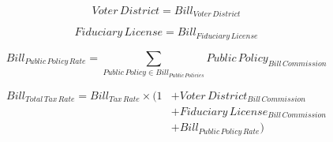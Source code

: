 \documentclass[fleqn]{article}
\begin{document}
	
\Large
	
\begin{equation}
	Voter \, District = Bill_{Voter \, District} 
\end{equation}


\begin{equation} 
	Fiduciary \, License = Bill_{Fiduciary \, License}
\end{equation}

\begin{equation}
	Bill_{Public \, Policy \, Rate} = \displaystyle\sum_{Public \, Policy \in Bill_{Public \, Policies}} Public \, Policy_{Bill \, Commission} 	
\end{equation}

\begin{equation}
	\begin{split}
	Bill_{Total \, Tax \, Rate} = Bill_{Tax \, Rate} \times (1 & + Voter \, District_{Bill \, Commission} \\
	& + Fiduciary \, License_{Bill \, Commission} \\
	& + Bill_{Public \, Policy \, Rate})
	\end{split}
\end{equation}
\end{document}
